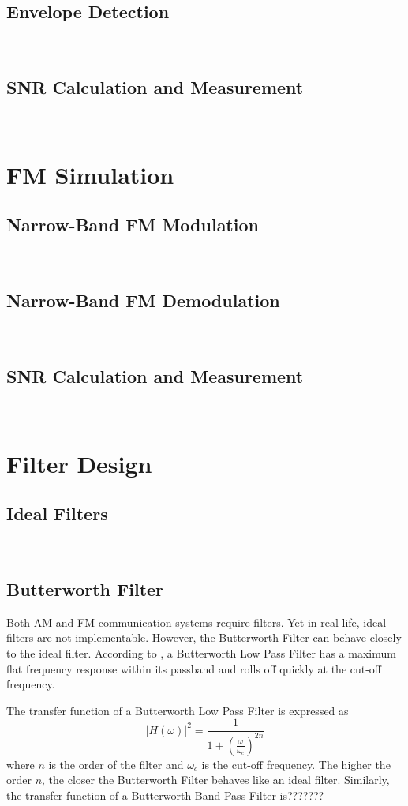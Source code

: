 \documentclass[../ECE459FinalProjectReport.tex]{subfiles}
\begin{document}
\subsection{Envelope Detection}
~
\subsection{SNR Calculation and Measurement}
~
\section{FM Simulation}
\subsection{Narrow-Band FM Modulation}
~
\subsection{Narrow-Band FM Demodulation}
~
\subsection{SNR Calculation and Measurement}
~
\section{Filter Design}
\subsection{Ideal Filters}
~
\subsection{Butterworth Filter}

Both AM and FM communication systems require filters. Yet in real life, ideal filters are not implementable. However, the Butterworth Filter can behave closely to the ideal filter. According to \cite{storrButterworthFilterDesign2013,kudekiAnalogSignalsSystems2009}, a Butterworth Low Pass Filter has a maximum flat frequency response within its passband and rolls off quickly at the cut-off frequency.

The transfer function of a Butterworth Low Pass Filter is expressed as
\begin{equation}
    \left| H\left( \omega \right) \right|^2=\frac{1}{1+\left( \frac{\omega}{\omega _c} \right) ^{2n}}
\end{equation}
where $n$ is the order of the filter and $\omega_c$ is the cut-off frequency. The higher the order $n$, the closer the Butterworth Filter behaves like an ideal filter. Similarly, the transfer function of a Butterworth Band Pass Filter is???????
\end{document}
